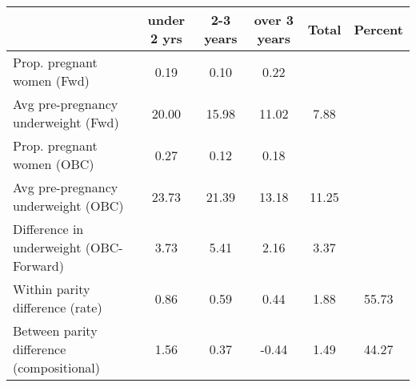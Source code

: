 \begin{tabular}{l*{5}{c}}
\toprule
            &\multicolumn{1}{c}{under 2 yrs}&\multicolumn{1}{c}{2-3 years}&\multicolumn{1}{c}{over 3 years}&\multicolumn{1}{c}{Total}&\multicolumn{1}{c}{Percent}\\
\midrule
\midrule
Prop. pregnant women (Fwd)&        0.19&        0.10&        0.22&            &            \\
Avg pre-pregnancy underweight (Fwd)&       20.00&       15.98&       11.02&        7.88&            \\
Prop. pregnant women (OBC)&        0.27&        0.12&        0.18&            &            \\
Avg pre-pregnancy underweight (OBC)&       23.73&       21.39&       13.18&       11.25&            \\
Difference in underweight (OBC-Forward)&        3.73&        5.41&        2.16&        3.37&            \\
Within parity difference (rate)&        0.86&        0.59&        0.44&        1.88&       55.73\\
Between parity difference (compositional)&        1.56&        0.37&       -0.44&        1.49&       44.27\\
\bottomrule
\end{tabular}
